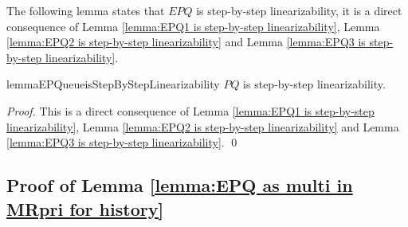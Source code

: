 The following lemma states that $\textit{EPQ}$ is step-by-step linearizability, it is a direct consequence of Lemma \ref{lemma:EPQ1 is step-by-step linearizability}, Lemma \ref{lemma:EPQ2 is step-by-step linearizability} and Lemma \ref{lemma:EPQ3 is step-by-step linearizability}.



\begin{restatable}{lemma}{EPQueueisStepByStepLinearizability}
\label{lemma:EPQ is step-by-step linearizability}
$\textit{PQ}$ is step-by-step linearizability.
\end{restatable} 

\begin {proof}
This is a direct consequence of Lemma \ref{lemma:EPQ1 is step-by-step linearizability}, Lemma \ref{lemma:EPQ2 is step-by-step linearizability} and Lemma \ref{lemma:EPQ3 is step-by-step linearizability}. \qed
\end {proof}


\subsection{Proof of Lemma \ref{lemma:EPQ as multi in MRpri for history}}

\EPQasMultiInMRpriforHistory*

